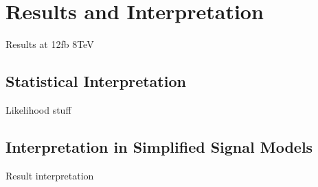 \chapter{Results and Interpretation}
\label{chap:SUSYresults}

Results at 12fb 8TeV

\section{Statistical Interpretation}
\label{sec:resultsintro}

Likelihood stuff

\section{Interpretation in Simplified Signal Models}
\label{sec:resultsms}

Result interpretation


